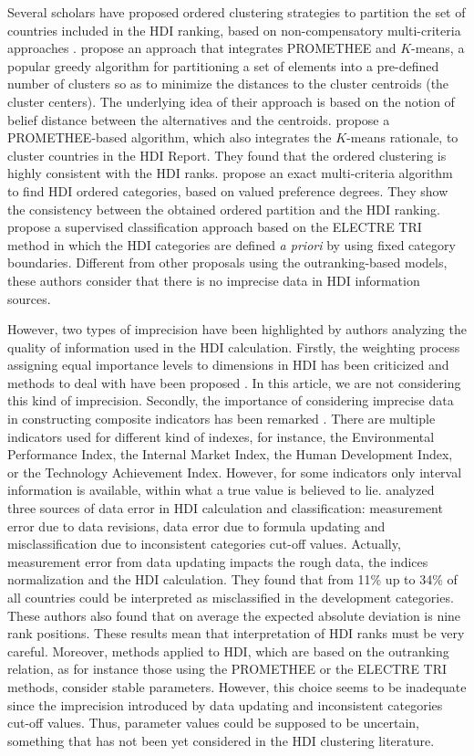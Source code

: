 \documentclass[]{elsarticle}
\theoremstyle{definition}
\begin{document}
Several scholars have proposed  ordered clustering strategies to partition the set of countries included in the HDI ranking,  based on non-compensatory multi-criteria approaches \citep{DeSmet2014}.   \cite{Boujelben2016} propose an approach that integrates PROMETHEE and $K$-means, a popular greedy algorithm for partitioning a set of elements into a pre-defined number of clusters so as to minimize the distances to the cluster centroids (the cluster centers). The underlying idea of their approach is based on the notion of belief distance between the alternatives and the centroids. \cite{Chen2018} propose a PROMETHEE-based algorithm, which also integrates the $K$-means rationale, to cluster countries in the HDI Report. They found that the ordered clustering is highly consistent with the HDI ranks. \cite{DeSmet2012} propose an exact multi-criteria algorithm to find HDI ordered categories, based on valued preference degrees.  They show the consistency between the obtained ordered partition and the HDI ranking.  \cite{Monteiro2018} propose a supervised classification approach based on the ELECTRE TRI method in which the HDI categories are defined \emph{a priori} by using fixed category boundaries. Different from other proposals using the outranking-based models, these authors consider that there is no imprecise data in HDI information sources. 

However, two types of imprecision have been highlighted by authors analyzing the quality of information used in the HDI calculation.  Firstly, the weighting process assigning equal importance levels to dimensions in HDI has been criticized and methods to deal with have been proposed \citep{Zheng2015}. In this article, we are not considering this kind of imprecision.  Secondly, the importance of considering imprecise data in constructing composite indicators has been remarked \citep{Cherchye2011}.  There are multiple indicators used for different kind of indexes, for instance, the Environmental Performance Index, the Internal Market Index, the Human Development Index, or the Technology Achievement Index. However, for some indicators only interval information is available, within what a true value is believed to lie.   \cite{Wolff2011} analyzed three sources of data error in HDI calculation and classification: measurement error due to data revisions, data error due to formula updating and misclassification due to inconsistent categories cut-off values. Actually,  measurement error from data updating impacts the rough data, the indices normalization and the HDI calculation. They found that from 11\% up to 34\% of all countries could be interpreted as misclassified in the development categories. These authors also found that on average the expected absolute deviation is nine rank positions. These results mean that interpretation of HDI ranks must be very careful.  Moreover, methods applied to HDI, which are based on the outranking relation, as for instance those using the PROMETHEE or the ELECTRE TRI methods, consider stable parameters.  However, this choice seems to be inadequate since the imprecision introduced by data updating and   inconsistent categories cut-off values.  Thus, parameter values could be supposed to be uncertain, something that has not been yet considered in the HDI clustering literature.
\end{document}

